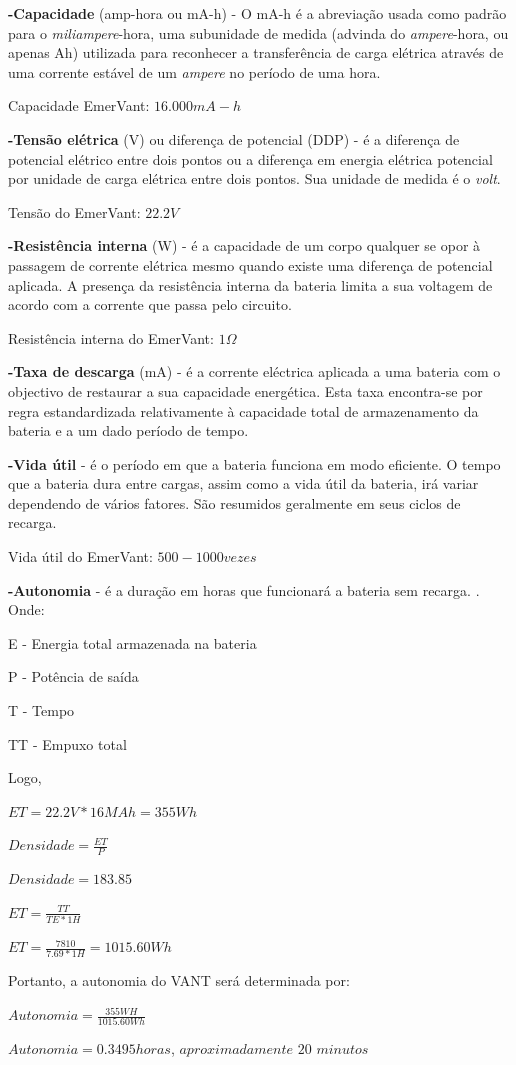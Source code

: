\textbf{-Capacidade} (amp-hora ou mA-h) -  O mA-h é a abreviação usada como padrão para o \textit{miliampere}-hora, uma subunidade de medida (advinda do \textit{ampere}-hora, ou apenas Ah) utilizada para reconhecer a transferência de carga elétrica através de uma corrente estável de um \textit{ampere} no período de uma hora.

	Capacidade EmerVant: $16.000mA-h$

\textbf{-Tensão elétrica} (V) ou diferença de potencial (DDP) - é a diferença de potencial elétrico entre dois pontos ou a diferença em energia elétrica potencial por unidade de carga elétrica entre dois pontos. Sua unidade de medida é o \textit{volt}.
	
	Tensão do EmerVant: $22.2 V$

\textbf{-Resistência interna} (W) - é a capacidade de um corpo qualquer se opor à passagem de corrente elétrica mesmo quando existe uma diferença de potencial aplicada. A presença da resistência interna da bateria limita a sua voltagem de acordo com a corrente que passa pelo circuito.

	Resistência interna do EmerVant: $1\Omega$

\textbf{-Taxa de descarga} (mA) - é a corrente eléctrica aplicada a uma bateria com o objectivo de restaurar a sua capacidade energética. Esta taxa encontra-se por regra estandardizada relativamente à capacidade total de armazenamento da bateria e a um dado período de tempo.

\textbf{-Vida útil} - é o período em que a bateria funciona em modo eficiente. O tempo que a bateria dura entre cargas, assim como a vida útil da bateria, irá variar dependendo de vários fatores. São resumidos geralmente em seus ciclos de recarga.
	
	Vida útil do EmerVant: $500-1000 vezes$

\textbf{-Autonomia} - é a duração em horas que funcionará a bateria sem recarga. \cite{esteban}. Onde:

E - Energia total armazenada na bateria

P - Potência de saída

T - Tempo

TT - Empuxo total

Logo,

$ET= 22.2 V * 16MAh= 355Wh$

$Densidade = \frac{ET}{P}$

$Densidade = 183.85$

$ET= \frac{TT}{TE*1H}$

$ET = \frac{7810}{7.69*1H} = 1015.60 Wh$

Portanto, a autonomia do VANT será determinada por:

$Autonomia = \frac{355WH}{1015.60Wh}$

$Autonomia = 0.3495 horas$, $aproximadamente$ $20$ $minutos$
